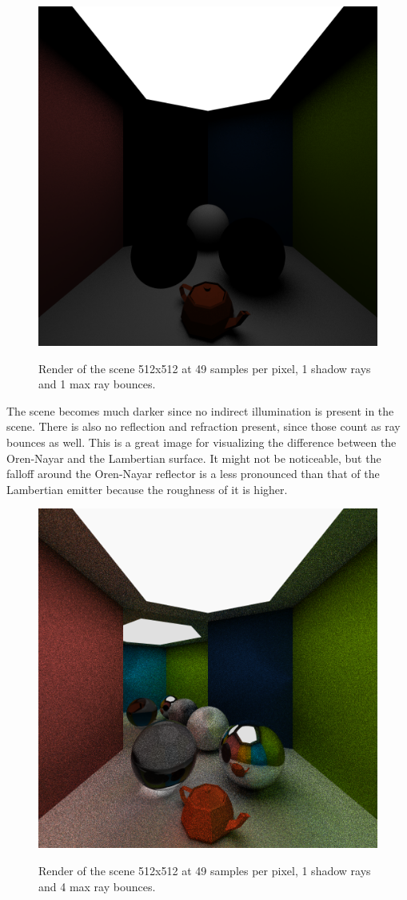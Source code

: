 \documentclass[a4paper, twocolumn]{article}
\begin{document}
            \begin{figure}[H]
                \centering
                \caption{Render of the scene 512x512 at 49 samples per pixel, 1 shadow rays and 1 max ray bounces.}
                \includegraphics[width=0.8\linewidth]{share/results/bounce_rays_1.png}
                \label{fig:bounce_rays_1}
            \end{figure}

            The scene becomes much darker since no indirect illumination is present in the scene. There is also no reflection and refraction present, since those count as ray bounces as well. This is a great image for visualizing the difference between the Oren-Nayar and the Lambertian surface. It might not be noticeable, but the falloff around the Oren-Nayar reflector is a less pronounced than that of the Lambertian emitter because the roughness of it is higher.

            \begin{figure}[H]
                \centering
                \caption{Render of the scene 512x512 at 49 samples per pixel, 1 shadow rays and 4 max ray bounces.}
                \includegraphics[width=0.7\linewidth]{share/results/bounce_rays_4.png}
                \label{fig:bounce_rays_4}
            \end{figure}
            \vspace{-0.5em}
\end{document}
